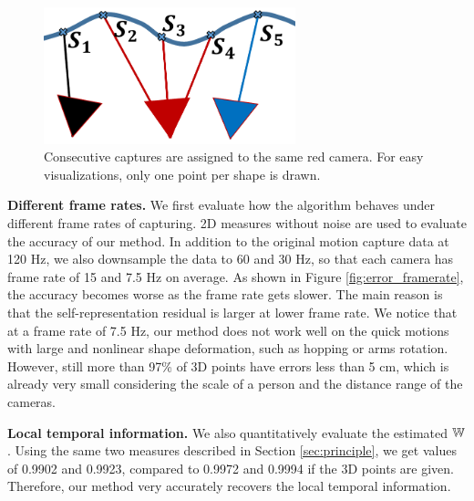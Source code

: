 \begin{figure}
\centering
\includegraphics[width=0.65\textwidth]{chapter5/resource/unconstrained_assignment_cropped.pdf}
\caption[Illustration of consecutive captures assigned to the same camera.]{Consecutive captures are assigned to the same red camera. For easy visualizations, only one point per shape is drawn.}
\label{fig:unconstrained_assign}
\end{figure}

\textbf{Different frame rates.}
We first evaluate how the algorithm behaves under different frame rates of capturing.
2D measures without noise are used to evaluate the accuracy of our method. In addition to the original motion capture data at 120 Hz, we also downsample the data to 60 and 30 Hz, so that each camera has frame rate of 15 and 7.5 Hz on average. As shown in Figure \ref{fig:error_framerate}, the accuracy becomes worse as the frame rate gets slower. 
The main reason is that the self-representation residual is larger at lower frame rate. We notice that at a frame rate of 7.5 Hz, our method does not work well on the quick motions with large and nonlinear shape deformation, such as hopping or arms rotation. However, still  more than 97\% of 3D points have errors less than 5 cm, which is already very small considering the scale of a person and the distance range of the cameras.

\textbf{Local temporal information.}
We also quantitatively evaluate the estimated $\mathbb W$. Using the same two measures described in Section \ref{sec:principle}, 
we get values of 0.9902 and 0.9923, compared to 0.9972 and 0.9994 if the 3D points are given. Therefore, our method very accurately recovers the local temporal information.

